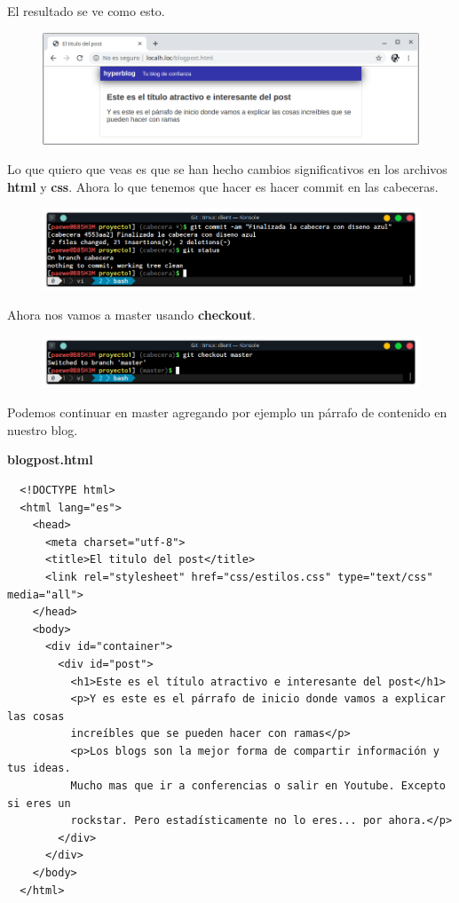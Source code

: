 \documentclass{article}
\begin{document}
El resultado se ve como esto.

\newpage

\begin{figure}[h!]
  \centering
  \includegraphics[scale=0.75]{./Pictures/148_web_header.png}
\end{figure}

Lo que quiero que veas es que se han hecho cambios significativos en los
archivos \textbf{html} y \textbf{css}. Ahora lo que tenemos que hacer es hacer
commit en las cabeceras.

\begin{figure}[h!]
  \centering
  \includegraphics[scale=0.75]{./Pictures/149_git_commit.png}
\end{figure}

Ahora nos vamos a master usando \textbf{checkout}.

\begin{figure}[h!]
  \centering
  \includegraphics[scale=0.75]{./Pictures/150_checkout_master.png}
\end{figure}

Podemos continuar en master agregando por ejemplo un párrafo de contenido en
nuestro blog.

\textbf{blogpost.html}
\begin{verbatim}
  <!DOCTYPE html>
  <html lang="es">
    <head>
      <meta charset="utf-8">
      <title>El titulo del post</title>
      <link rel="stylesheet" href="css/estilos.css" type="text/css" media="all">
    </head>
    <body>
      <div id="container">
        <div id="post">
          <h1>Este es el título atractivo e interesante del post</h1>
          <p>Y es este es el párrafo de inicio donde vamos a explicar las cosas
          increíbles que se pueden hacer con ramas</p>
          <p>Los blogs son la mejor forma de compartir información y tus ideas.
          Mucho mas que ir a conferencias o salir en Youtube. Excepto si eres un
          rockstar. Pero estadísticamente no lo eres... por ahora.</p>
        </div>
      </div>
    </body>
  </html>
\end{verbatim}
\end{document}
